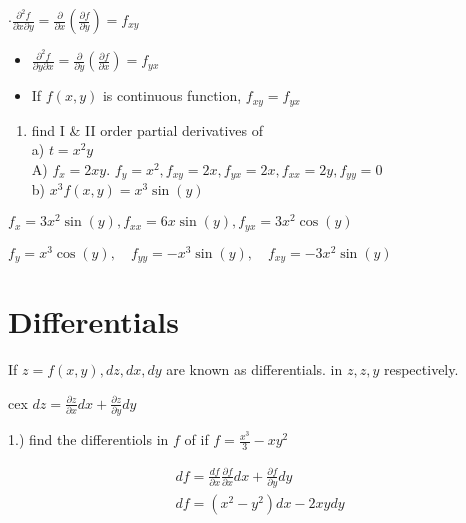 $\cdot \frac{\partial^{2} f}{\partial x \partial y}=\frac{\partial}{\partial x}\left(\frac{\partial f}{\partial y}\right)=f_{x y}$

\begin{itemize}
	\item $\frac{\partial^{2} f}{\partial y \partial x}=\frac{\partial}{\partial y}\left(\frac{\partial f}{\partial x}\right)=f_{y x}$
\end{itemize}

\begin{itemize}
	\item If $f(x, y)$ is continuous function, $f_{x y}=f_{y x}$
\end{itemize}

\begin{enumerate}
	\item find I \& II order partial derivatives of\\
	      a) $t=x^2 y$\\
	      A) $f_{x}=2 x y$. $f_{y}=x^2 , f_{x y}=2 x, f_{y x}=2 x, f_{x x}=2 y, f_{y y}=0$\\
	      b) $x^{3} f(x, y)=x^{3} \sin(y)$
\end{enumerate}

$f_{x}=3 x^2 \sin(y), f_{x x}=6 x \sin(y), f_{y x}=3 x^2 \cos(y)$

$f_{y}=x^{3} \cos(y), \quad f_{y y}=-x^{3} \sin(y), \quad f_{x y}=-3 x^2 \sin(y)$

\section*{Differentials}
If $z=f(x, y), d z, d x, d y$ are known as differentials. in $z, z, y$ respectively.

cex $d z=\frac{\partial z}{\partial x} d x+\frac{\partial z}{\partial y} d y$

1.) find the differentiols in $f$ of if $f=\frac{x^{3}}{3}-x y^2$

$$
	\begin{array}{r}
		d f=\frac{d f}{\partial x} \frac{\partial f}{\partial x} d x+\frac{\partial f}{\partial y} d y \\
		d f=\left(x^2 -y^2\right) d x-2 x y d y
	\end{array}
$$
